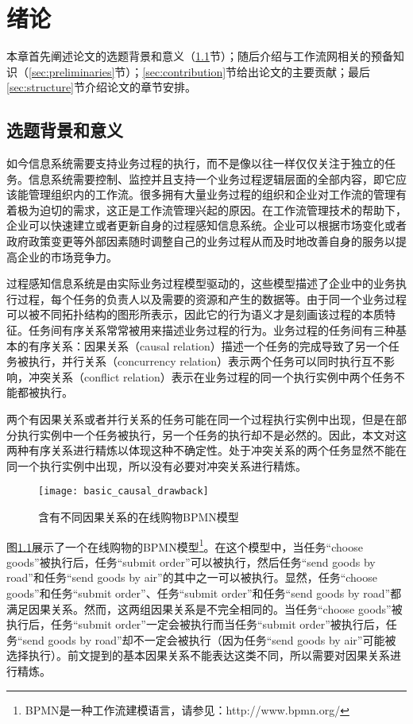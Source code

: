 \chapter{绪论}\label{cha:intro}
本章首先阐述论文的选题背景和意义（\ref{sec:background}节）；随后介绍与工作流网相关的预备知识（\ref{sec:preliminaries}节）；\ref{sec:contribution}节给出论文的主要贡献；最后\ref{sec:structure}节介绍论文的章节安排。

\section{选题背景和意义}\label{sec:background}
如今信息系统需要支持业务过程的执行，而不是像以往一样仅仅关注于独立的任务。信息系统需要控制、监控并且支持一个业务过程逻辑层面的全部内容，即它应该能管理组织内的工作流。很多拥有大量业务过程的组织和企业对工作流的管理有着极为迫切的需求，这正是工作流管理兴起的原因\cite{van1998application}。在工作流管理技术的帮助下，企业可以快速建立或者更新自身的过程感知信息系统\cite{dumas2005process}。企业可以根据市场变化或者政府政策变更等外部因素随时调整自己的业务过程从而及时地改善自身的服务以提高企业的市场竞争力。

过程感知信息系统是由实际业务过程模型驱动的，这些模型描述了企业中的业务执行过程，每个任务的负责人以及需要的资源和产生的数据等。由于同一个业务过程可以被不同拓扑结构的图形所表示，因此它的行为语义才是刻画该过程的本质特征。任务间有序关系\cite{esparza2002improvement}常常被用来描述业务过程的行为。业务过程的任务间有三种基本的有序关系：因果关系（causal relation）描述一个任务的完成导致了另一个任务被执行，并行关系（concurrency relation）表示两个任务可以同时执行互不影响，冲突关系（conflict relation）表示在业务过程的同一个执行实例中两个任务不能都被执行。

两个有因果关系或者并行关系的任务可能在同一个过程执行实例中出现，但是在部分执行实例中一个任务被执行，另一个任务的执行却不是必然的。因此，本文对这两种有序关系进行精炼以体现这种不确定性。处于冲突关系的两个任务显然不能在同一个执行实例中出现，所以没有必要对冲突关系进行精炼。

\begin{figure}[htbp]
  \centering
  \texttt{[image: basic\_causal\_drawback]}
  \caption{含有不同因果关系的在线购物BPMN模型\label{fig:basic_causal_drawback}}
\end{figure}

\begin{example}\label{ex:basic_causal_drawback}
图\ref{fig:basic_causal_drawback}展示了一个在线购物的BPMN模型\footnote{BPMN是一种工作流建模语言，请参见：http://www.bpmn.org/}。在这个模型中，当任务“choose goods”被执行后，任务“submit order”可以被执行，然后任务“send goods by road”和任务“send goods by air”的其中之一可以被执行。显然，任务“choose goods”和任务“submit order”、任务“submit order”和任务“send goods by road”都满足因果关系。然而，这两组因果关系是不完全相同的。当任务“choose goods”被执行后，任务“submit order”一定会被执行而当任务“submit order”被执行后，任务“send goods by road”却不一定会被执行（因为任务“send goods by air”可能被选择执行）。前文提到的基本因果关系不能表达这类不同，所以需要对因果关系进行精炼。
\end{example}

